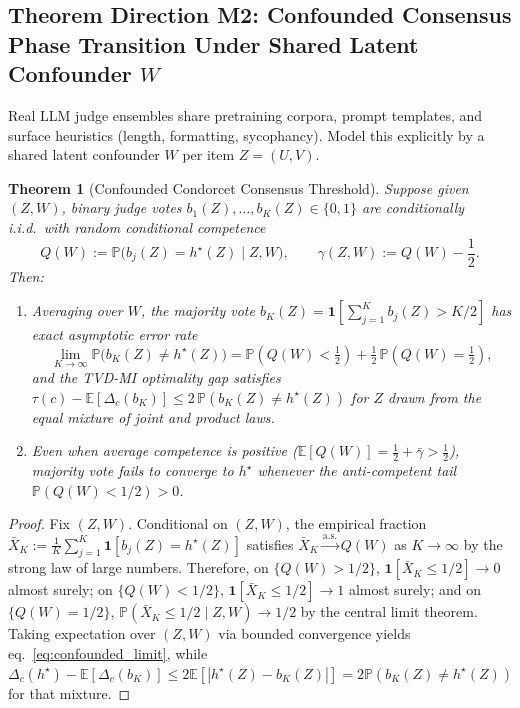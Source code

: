 \documentclass[11pt]{article}
\newtheorem{theorem}{Theorem}[section]
\newcommand{\E}{\mathbb{E}}
\newcommand{\Prob}{\mathbb{P}}
\newcommand{\ind}{\mathbf{1}}
\begin{document}
\subsection{\texorpdfstring{Theorem Direction M2: Confounded Consensus Phase Transition Under Shared Latent Confounder $W$}{Consensus under a shared latent confounder}}
\label{sec:confounded_consensus}

Real LLM judge ensembles share pretraining corpora, prompt templates, and surface heuristics (length, formatting, sycophancy). Model this explicitly by a shared latent confounder $W$ per item $Z=(U,V)$.

\begin{theorem}[Confounded Condorcet Consensus Threshold]
\label{thm:confounded_consensus}
Suppose given $(Z, W)$, binary judge votes $b_1(Z),\dots,b_K(Z) \in \{0,1\}$ are conditionally i.i.d.\ with random conditional competence
\begin{equation}
Q(W) := \Prob\big(b_j(Z) = h^\star(Z) \mid Z, W\big), \qquad \gamma(Z,W) := Q(W) - \frac{1}{2}.
\end{equation}
Then:
\begin{enumerate}[leftmargin=*,itemsep=2pt]
\item Averaging over $W$, the majority vote $b_K(Z) = \ind[\sum_{j=1}^K b_j(Z) > K/2]$ has exact asymptotic error rate
\begin{equation}
\label{eq:confounded_limit}
\boxed{\lim_{K \to \infty} \Prob\big(b_K(Z) \neq h^\star(Z)\big)
= \Prob\!\left(Q(W) < \tfrac{1}{2}\right) + \tfrac{1}{2}\,\Prob\!\left(Q(W) = \tfrac{1}{2}\right),}
\end{equation}
and the TVD-MI optimality gap satisfies $\tau(c) - \E[\Delta_c(b_K)] \le 2\,\Prob(b_K(Z) \neq h^\star(Z))$ for $Z$ drawn from the equal mixture of joint and product laws.
\item Even when average competence is positive ($\E[Q(W)] = \tfrac{1}{2} + \bar{\gamma} > \tfrac{1}{2}$), majority vote fails to converge to $h^\star$ whenever the anti-competent tail $\Prob(Q(W) < 1/2) > 0$.
\end{enumerate}
\end{theorem}

\begin{proof}
Fix $(Z, W)$. Conditional on $(Z, W)$, the empirical fraction $\bar{X}_K := \frac{1}{K}\sum_{j=1}^K \ind[b_j(Z) = h^\star(Z)]$ satisfies $\bar{X}_K \xrightarrow{\text{a.s.}} Q(W)$ as $K \to \infty$ by the strong law of large numbers. Therefore, on $\{Q(W) > 1/2\}$, $\ind[\bar{X}_K \le 1/2] \to 0$ almost surely; on $\{Q(W) < 1/2\}$, $\ind[\bar{X}_K \le 1/2] \to 1$ almost surely; and on $\{Q(W) = 1/2\}$, $\Prob(\bar{X}_K \le 1/2 \mid Z,W) \to 1/2$ by the central limit theorem. Taking expectation over $(Z,W)$ via bounded convergence yields eq.~\eqref{eq:confounded_limit}, while $\Delta_c(h^\star)-\E[\Delta_c(b_K)] \le 2\E[|h^\star(Z)-b_K(Z)|] = 2\Prob(b_K(Z)\neq h^\star(Z))$ for that mixture.
\end{proof}
\end{document}
